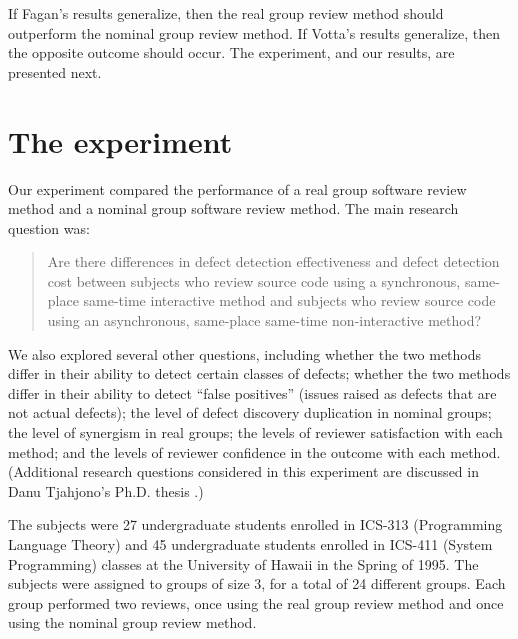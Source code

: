 If Fagan's results generalize, then the real group review method should
outperform the nominal group review method.  If Votta's results generalize,
then the opposite outcome should occur. The experiment, and our results,
are presented next.

\section{The experiment}

Our experiment compared the performance of a real group software review
method and a nominal group software review method.  The main research
question was:

\begin{quotation}
  
  
  Are there differences in defect detection effectiveness and defect detection cost
  between subjects who review source code using a synchronous, same-place
  same-time interactive method and subjects who review source code using an
  asynchronous, same-place same-time non-interactive method?

\end{quotation}

We also explored several other questions, including whether the two
methods differ in their ability to detect certain classes of defects;
whether the two methods differ in their ability to detect ``false
positives'' (issues raised as defects that are not actual defects); the level of
defect discovery duplication in nominal groups; the level of synergism in
real groups; the levels of reviewer satisfaction with each method; and the
levels of reviewer confidence in the outcome with each method.  (Additional
research questions considered in this experiment are discussed in Danu
Tjahjono's Ph.D. thesis \cite{csdl-95-08}.)

The subjects were 27 undergraduate students enrolled in ICS-313
(Programming Language Theory) and 45 undergraduate students enrolled in
ICS-411 (System Programming) classes at the University of Hawaii in the
Spring of 1995. The subjects were assigned to groups of size 3, for a total
of 24 different groups.  Each group performed two reviews, once using the
real group review method and once using the nominal group review method.


